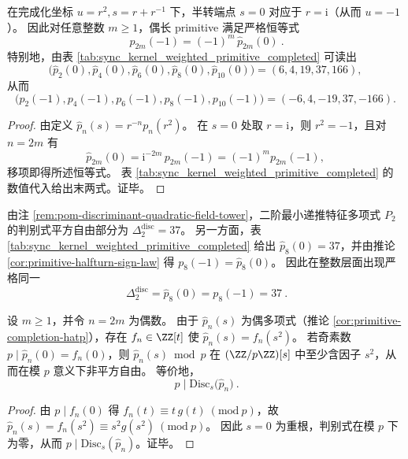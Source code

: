 \begin{corollary}\label{cor:primitive-halfturn-sign-law}
在完成化坐标 \(u=r^2,s=r+r^{-1}\) 下，半转端点 \(s=0\) 对应于 \(r=\mathrm{i}\)（从而 \(u=-1\)）。
因此对任意整数 \(m\ge 1\)，偶长 primitive 满足严格恒等式
\[
\boxed{\ p_{2m}(-1)=(-1)^m\,\widehat p_{2m}(0)\ }.
\]
特别地，由表 \ref{tab:sync_kernel_weighted_primitive_completed} 可读出
\[
\bigl(\widehat p_2(0),\widehat p_4(0),\widehat p_6(0),\widehat p_8(0),\widehat p_{10}(0)\bigr)=(6,4,19,37,166),
\]
从而
\[
\bigl(p_2(-1),p_4(-1),p_6(-1),p_8(-1),p_{10}(-1)\bigr)=(-6,4,-19,37,-166).
\]
\end{corollary}
\begin{proof}
由定义 \(\widehat p_n(s)=r^{-n}p_n(r^2)\)。
在 \(s=0\) 处取 \(r=\mathrm{i}\)，则 \(r^2=-1\)，且对 \(n=2m\) 有
\[
\widehat p_{2m}(0)=\mathrm{i}^{-2m}\,p_{2m}(-1)=(-1)^m p_{2m}(-1),
\]
移项即得所述恒等式。
表 \ref{tab:sync_kernel_weighted_primitive_completed} 的数值代入给出末两式。证毕。
\end{proof}

\begin{remark}[二次分辨率与半转端点的对角锁定：\texorpdfstring{$\Delta_2^{\mathrm{disc}}=\widehat p_8(0)=37$}{Delta2disc=hatp8(0)=37}]\label{rem:delta2disc-hatp8-diagonal-lock}
由注 \ref{rem:pom-discriminant-quadratic-field-tower}，二阶最小递推特征多项式 \(P_2\) 的判别式平方自由部分为 \(\Delta_2^{\mathrm{disc}}=37\)。
另一方面，表 \ref{tab:sync_kernel_weighted_primitive_completed} 给出 \(\widehat p_8(0)=37\)，并由推论 \ref{cor:primitive-halfturn-sign-law} 得 \(p_8(-1)=\widehat p_8(0)\)。
因此在整数层面出现严格同一
\[
\boxed{\ \Delta_2^{\mathrm{disc}}=\widehat p_8(0)=p_8(-1)=37\ }.
\]
\end{remark}

\begin{proposition}\label{prop:halfturn-prime-divides-discriminant}
设 \(m\ge 1\)，并令 \(n=2m\) 为偶数。
由于 \(\widehat p_n(s)\) 为偶多项式（推论 \ref{cor:primitive-completion-hatp}），存在 \(f_n\in\ZZ[t]\) 使
\(\widehat p_n(s)=f_n(s^2)\)。
若奇素数 \(p\mid \widehat p_n(0)=f_n(0)\)，则
\(\widehat p_n(s)\bmod p\) 在 \((\ZZ/p\ZZ)[s]\) 中至少含因子 \(s^2\)，从而在模 \(p\) 意义下非平方自由。
等价地，
\[
\boxed{\ p\mid \mathrm{Disc}_s\!\bigl(\widehat p_n\bigr)\ }.
\]
\end{proposition}
\begin{proof}
由 \(p\mid f_n(0)\) 得 \(f_n(t)\equiv t\,g(t)\ (\mathrm{mod}\ p)\)，故
\(\widehat p_n(s)=f_n(s^2)\equiv s^2 g(s^2)\ (\mathrm{mod}\ p)\)。
因此 \(s=0\) 为重根，判别式在模 \(p\) 下为零，从而 \(p\mid \mathrm{Disc}_s(\widehat p_n)\)。证毕。
\end{proof}

